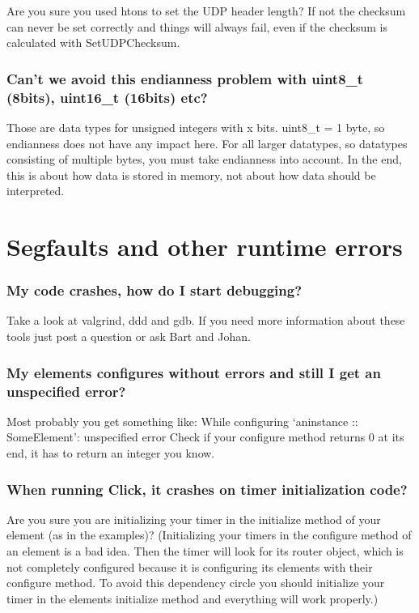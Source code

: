 \documentclass[a4paper]{article}
\begin{document}
Are you sure you used htons to set the UDP header length? If not the
checksum can never be set correctly and things will always fail, even if
the checksum is calculated with SetUDPChecksum.

\subsubsection*{Can't we avoid this endianness problem with uint8\_t (8bits), uint16\_t
(16bits) etc?}

Those are data types for unsigned integers with x bits. uint8\_t = 1
byte, so endianness does not have any impact here. For all larger
datatypes, so datatypes consisting of multiple bytes, you must take
endianness into account. In the end, this is about how data is stored in
memory, not about how data should be interpreted.

\section{Segfaults and other runtime errors}

\subsubsection*{My code crashes, how do I start debugging?}

Take a look at valgrind, ddd and gdb. If you need more information about
these tools just post a question or ask Bart and Johan.

\subsubsection*{My elements configures without errors and still I get an unspecified
error?}

Most probably you get something like: While configuring `aninstance ::
SomeElement': unspecified error Check if your configure method returns 0
at its end, it has to return an integer you know.

\subsubsection*{When running Click, it crashes on timer initialization code?}

Are you sure you are initializing your timer in the initialize method of
your element (as in the examples)? (Initializing your timers in the
configure method of an element is a bad idea. Then the timer will look
for its router object, which is not completely configured because it is
configuring its elements with their configure method. To avoid this
dependency circle you should initialize your timer in the elements
initialize method and everything will work properly.)
\end{document}
